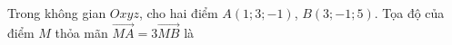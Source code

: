 \begin{ex}
Trong không gian $Oxyz$, cho hai điểm $A(1;3;-1)$, $B(3;-1;5)$. Tọa độ của điểm $M$ thỏa mãn $\overrightarrow{MA}=3\overrightarrow{MB}$ là
\end{ex}
